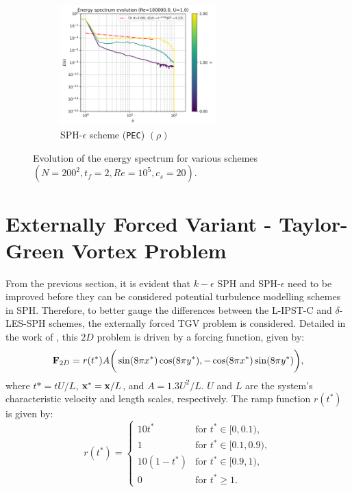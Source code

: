 \begin{figure}[htbp!]
\begin{subfigure}{7cm}
  \centering\includegraphics[width=6cm]{Code-Figures/long-tgv/c0_20_tait_hdx_2_pec_dtmul_1_mon2017_eps_0.5_no_n_o_files_50_nx_200_pst_10_re_100000_mon2017_tf_2/energy_spectrum_evolution_all.png}
  \caption{SPH-$\epsilon$ scheme (\texttt{PEC}) $(\rho)$}
  \end{subfigure}
  \caption{Evolution of the energy spectrum for various schemes $(N=200^2, t_f=2, Re=10^5, c_s=20)$.}
  \label{fig:ltgv-scheme-espec}
\end{figure}


\section{Externally Forced Variant - Taylor-Green Vortex Problem}

From the previous section, it is evident that $k-\epsilon$ SPH and SPH-$\epsilon$ need to be improved before they can be considered potential turbulence modelling schemes in SPH.
Therefore, to better gauge the differences between the L-IPST-C and $\delta$-LES-SPH schemes, the externally forced TGV problem is considered.
Detailed in the work of \cite{Colagrossi2021QuasiLagrangian}, this $2D$ problem is driven by a forcing function, given by:
\begin{equation}
  \mathbf{F}_{2D} = r(t^*) A \bigg( \sin(8\pi x^*) \cos(8\pi y^*), -\cos(8\pi x^*) \sin(8\pi y^*) \bigg),
\end{equation}
where $t*=tU/L$, $\mathbf{x}^* = \mathbf{x}/L$, and $A=1.3U^2/L$. $U$ and $L$ are the system's characteristic velocity and length scales, respectively.
The ramp function $r(t^*)$ is given by:
\begin{equation}
  r(t^*) = \begin{cases}
    10 t^* & \text{for } t^* \in [0, 0.1), \\
    1 & \text{for } t^* \in [0.1, 0.9), \\
    10 (1 - t^*) & \text{for } t^* \in [0.9, 1), \\
    0 & \text{for } t^* \geq 1.
  \end{cases}
\end{equation}

